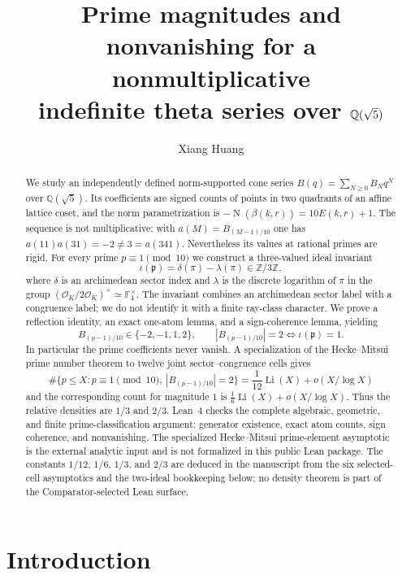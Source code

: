 \documentclass[12pt]{amsart}
\title[Prime magnitudes of a nonmultiplicative theta series]
{Prime magnitudes and nonvanishing for a nonmultiplicative\\
indefinite theta series over $\QQ(\sqrt5)$}
\author{Xiang Huang}
\date{}
\theoremstyle{definition}
\theoremstyle{remark}
\DeclareMathOperator{\N}{N}
\newcommand{\ZZ}{\mathbb{Z}}
\newcommand{\QQ}{\mathbb{Q}}
\newcommand{\FF}{\mathbb{F}}
\newcommand{\OK}{\mathcal{O}_K}
\begin{document}
\begin{abstract}
We study an independently defined norm-supported cone series
$B(q)=\sum_{N\geq0}B_Nq^N$ over $\QQ(\sqrt5)$.  Its coefficients are
signed counts of points in two quadrants of an affine lattice coset,
and the norm parametrization is
$-\N(\beta(k,r))=10E(k,r)+1$.  The sequence is not multiplicative:
with $a(M)=B_{(M-1)/10}$ one has
$a(11)a(31)=-2\neq3=a(341)$.  Nevertheless its values at rational
primes are rigid.  For every prime $p\equiv1\pmod{10}$ we construct a
three-valued ideal invariant
\[
  \iota(\mathfrak p)=\delta(\pi)-\lambda(\pi)\in\ZZ/3\ZZ,
\]
where $\delta$ is an archimedean sector index and $\lambda$ is the
discrete logarithm of $\pi$ in the group
$(\OK/2\OK)^\times\simeq\FF_4^\times$.  The invariant combines an
archimedean sector label with a congruence label; we do not identify it
with a finite ray-class character.  We prove a reflection identity, an
exact one-atom lemma, and a sign-coherence lemma,
yielding
\[
  B_{(p-1)/10}\in\{-2,-1,1,2\},
  \qquad
  |B_{(p-1)/10}|=2\iff\iota(\mathfrak p)=1.
\]
In particular the prime coefficients never vanish.  A specialization
of the Hecke--Mitsui prime number theorem to twelve joint
sector--congruence cells gives
\[
 \#\{p\leq X:p\equiv1\pmod{10},\ |B_{(p-1)/10}|=2\}
 =\frac1{12}\operatorname{Li}(X)+o(X/\log X)
\]
and the corresponding count for magnitude $1$ is
$\frac16\operatorname{Li}(X)+o(X/\log X)$.  Thus the relative
densities are $1/3$ and $2/3$.  Lean~4 checks the complete algebraic,
geometric, and finite prime-classification argument: generator
existence, exact atom counts, sign coherence, and nonvanishing.  The
specialized Hecke--Mitsui prime-element asymptotic is the
external analytic input and is not formalized in this public Lean package.
The constants $1/12$, $1/6$, $1/3$, and $2/3$ are deduced in the manuscript
from the six selected-cell asymptotics and the two-ideal bookkeeping below;
no density theorem is part of the Comparator-selected Lean surface.
\end{abstract}

\maketitle

\section{Introduction}\label{sec:intro}
\end{document}
